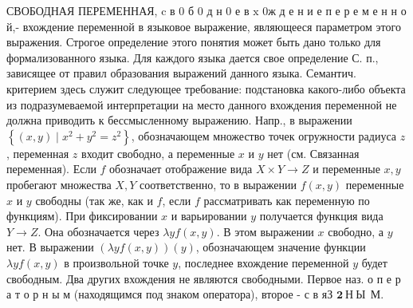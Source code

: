 \documentclass[10pt]{article}
\begin{document}
СВОБОДНАЯ ПЕРЕМЕННАЯ, $\mathrm{c}$ в 0 б 0 д н 0 е в $\mathrm{x}$ 0ж д е н и е п е р е м е н н о й,- вхождение переменной в языковое выражение, являющееся параметром этого выражения. Строгое определение этого понятия может быть дано только для формализованного языка. Для каждого языка дается свое определение С. п., зависящее от правил образования выражений данного языка. Семантич. критерием здесь служит следующее требование: подстановка какого-либо объекта из подразумеваемой интерпретации на место данного вхождения переменной не должна приводить к бессмысленному выражению. Напр., в выражении $\left\{(x, y) \mid x^{2}+y^{2}=z^{2}\right\}$, обозначающем множество точек огружности радиуса $z$, переменная $z$ входит свободно, а переменные $x$ и $y$ нет (см. Связанная переменная). Если $f$ обозначает отображение вида $X \times Y \rightarrow Z$ и переменные $x, y$ пробегают множества $X, Y$ соответственно, то в выражении $f(x, y)$ переменные $x$ и $y$ свободны (так же, как и $f$, если $f$ рассматривать как переменную по функциям). При фиксировании $x$ и варьировании $y$ получается функция вида $Y \rightarrow Z$. Она обозначается через $\lambda y f(x, y)$. В этом выражении $x$ свободно, а $y$ нет. В выражении $(\lambda y f(x, y))(y)$, обозначающем значение функции $\lambda y f(x, y)$ в произвольной точке $y$, последнее вхождение переменной $y$ будет свободным. Два других вхождения не являются свободными. Первое наз. о п е р а т о р н ы м (находящимся под знаком оператора), второе - с в яЗ $\mathbf{2} \mathbf{~ Н ~ Ы ~} \mathbf{~ М . ~}$
\end{document}
